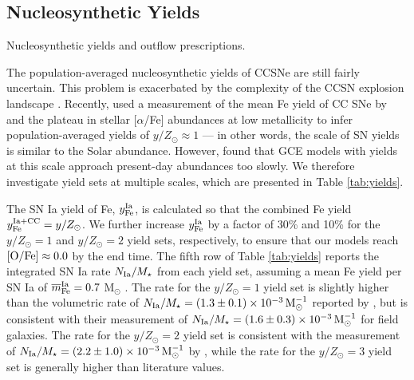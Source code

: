 \documentclass[twocolumn,twocolappendix,linenumbers]{aastex631}
\newcommand{\aFe}{[$\alpha$/Fe]\xspace}
\newcommand{\mathOFe}{{\rm [O/Fe]}}
\newcommand{\yZ}[1]{$y/Z_\odot=#1$}
\begin{document}
\subsection{Nucleosynthetic Yields}
\label{sec:yields}

\begin{table}
    \centering
    \caption{Nucleosynthetic yields and outflow prescriptions.}
    
    \label{tab:yields}
\end{table}

The population-averaged nucleosynthetic yields of CCSNe are still fairly uncertain. This problem is exacerbated by the complexity of the CCSN explosion landscape \citep{sukhbold_core-collapse_2016}. Recently, \citet{weinberg_scale_2024} used a measurement of the mean Fe yield of CC SNe by \citet{rodriguez_iron_2023} and the plateau in stellar \aFe abundances at low metallicity to infer population-averaged yields of $y/Z_\odot\approx1$ --- in other words, the scale of SN yields is similar to the Solar abundance. However, \citet{johnson_milky_2024} found that GCE models with yields at this scale approach present-day abundances too slowly. We therefore investigate yield sets at multiple scales, which are presented in Table \ref{tab:yields}.

The SN Ia yield of Fe, $y_{\rm Fe}^{\rm Ia}$, is calculated so that the combined Fe yield $y_{\rm Fe}^{\rm Ia+CC}=y/Z_\odot$. We further increase $y_{\rm Fe}^{\rm Ia}$ by a factor of 30\% and 10\% for the \yZ{1} and \yZ{2} yield sets, respectively, to ensure that our models reach $\mathOFe\approx0.0$ by the end time. The fifth row of Table \ref{tab:yields} reports the integrated SN Ia rate $N_{\rm Ia}/M_\star$ from each yield set, assuming a mean Fe yield per SN Ia of $\overline m_{\rm Fe}^{\rm Ia}=0.7$ M$_\odot$ \citep{mazzali_common_2007,howell_effect_2009}. The rate for the \yZ{1} yield set is slightly higher than the volumetric rate of $N_{\rm Ia}/M_\star=(1.3\pm0.1)\times10^{-3}\,{\rm M}_\odot^{-1}$ reported by \citet{maoz_star_2017}, but is consistent with their measurement of $N_{\rm Ia}/M_\star=(1.6\pm0.3)\times10^{-3}\,{\rm M}_\odot^{-1}$ for field galaxies. The rate for the \yZ{2} yield set is consistent with the measurement of $N_{\rm Ia}/M_\star=(2.2\pm1.0)\times10^{-3}\,{\rm M}_\odot^{-1}$ by \citet{maoz_type-ia_2012}, while the rate for the \yZ{3} yield set is generally higher than literature values.
\end{document}
